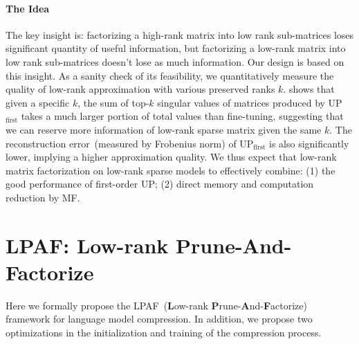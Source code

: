 \paragraph{The Idea}
The key insight is: factorizing a high-rank matrix into low rank sub-matrices
loses significant quantity of useful information, but factorizing a low-rank matrix into low rank sub-matrices
doesn't lose as much information. Our design is based on this insight. 
As a sanity check of its feasibility, we quantitatively measure the 
quality of low-rank approximation with various preserved ranks $k$. 
 shows that given a specific $k$, 
the sum of top-$k$ singular values of matrices produced by UP$_\text{first}$ takes a much larger portion of total values than fine-tuning, suggesting that we can reserve more information of low-rank sparse matrix given the same $k$. The reconstruction error~(measured by Frobenius norm) of UP$_\text{first}$ is also significantly lower, implying a higher approximation quality. We thus expect that low-rank matrix factorization on low-rank sparse models to effectively combine: 
(1) the good performance of first-order UP; 
(2) direct memory and computation reduction by MF.

\section{LPAF: Low-rank Prune-And-Factorize}
\label{sec:approach}
Here we formally propose the LPAF~(\textbf{L}ow-rank \textbf{P}rune-\textbf{A}nd-\textbf{F}actorize) framework 
for language model compression. In addition, 
we propose two optimizations in the 
initialization and training of the compression process.

